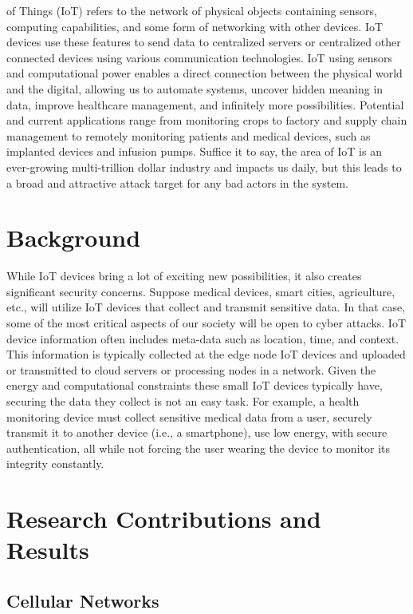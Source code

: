 \documentclass[journal,onecolumn]{IEEEtran}
\begin{document}
 of Things (IoT) refers to the network of physical objects containing sensors, computing capabilities, and some form of networking with other devices. IoT devices use these features to send data to centralized servers or centralized other connected devices using various communication technologies. IoT using sensors and computational power enables a direct connection between the physical world and the digital, allowing us to automate systems, uncover hidden meaning in data, improve healthcare management, and infinitely more possibilities. Potential and current applications range from monitoring crops to factory and supply chain management to remotely monitoring patients and medical devices, such as implanted devices and infusion pumps. Suffice it to say, the area of IoT is an ever-growing multi-trillion dollar industry and impacts us daily, but this leads to a broad and attractive attack target for any bad actors in the system. 

\section{Background}

While IoT devices bring a lot of exciting new possibilities, it also creates significant security concerns. Suppose medical devices, smart cities, agriculture, etc., will utilize IoT devices that collect and transmit sensitive data. In that case, some of the most critical aspects of our society will be open to cyber attacks. IoT device information often includes meta-data such as location, time, and context. This information is typically collected at the edge node IoT devices and uploaded or transmitted to cloud servers or processing nodes in a network. Given the energy and computational constraints these small IoT devices typically have, securing the data they collect is not an easy task. For example, a health monitoring device must collect sensitive medical data from a user, securely transmit it to another device (i.e., a smartphone), use low energy, with secure authentication, all while not forcing the user wearing the device to monitor its integrity constantly. 

\section{Research Contributions and Results}

\subsection{Cellular Networks}
\end{document}
